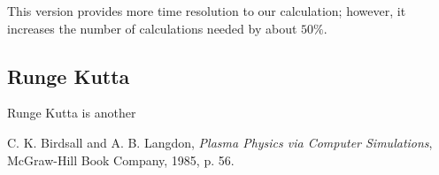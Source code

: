 \documentclass{article}
\begin{document}
This version provides more time resolution to our calculation; however, it increases the number of calculations needed by about $50\%$.



\subsection{Runge Kutta}

Runge Kutta is another 



\begin{thebibliography}{9}
C. K. Birdsall and A. B. Langdon, \emph{Plasma Physics via Computer Simulations}, McGraw-Hill Book Company, 1985, p. 56.
\end{thebibliography}
\end{document}
